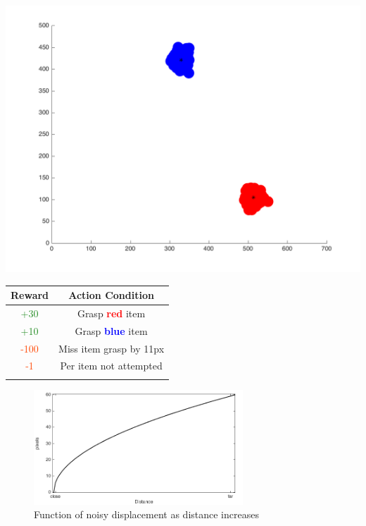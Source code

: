 \documentclass[11]{article}
\begin{document}
  \begin{minipage}[b]{0.39\textwidth}
    \includegraphics[width=1\textwidth]{figures/Scene.png}
    \label{fig:scene}
  \end{minipage}
  \hfill
  \begin{minipage}[b]{0.60\textwidth}
    \centering
    \begin{tabular}{cc}\hline
        \textbf{Reward} & \textbf{Action Condition}\\ \hline
        
        \textcolor{ForestGreen}{+30} & Grasp \textbf{\textcolor{red}{red}} item \\
        \textcolor{ForestGreen}{+10} & Grasp \textbf{\textcolor{blue}{blue}} item \\
        \textcolor{OrangeRed}{-100} & Miss item grasp by 11px \\
        \textcolor{OrangeRed}{-1} & Per item not attempted \\
        \hline
        \\
        
      \end{tabular}
      \label{table:rewards}
    \end{minipage}

\begin{figure}[h]
	\centering
	\includegraphics[width=0.7\textwidth]{figures/Noise.png}
	\caption{Function of noisy displacement as distance increases}
	\label{fig:noise}
\end{figure}
\end{document}
